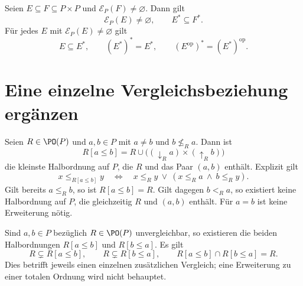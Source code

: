 \begin{theorem}
\label{b12guide:thm:generated-laws}
Seien $E\subseteq F\subseteq P\times P$ und
$\mathcal E_P(F)\ne\varnothing$. Dann gilt
\[
 \mathcal E_P(E)\ne\varnothing,\qquad E^*\subseteq F^*.
\]
Für jedes $E$ mit $\mathcal E_P(E)\ne\varnothing$ gilt
\[
 E\subseteq E^*,\qquad (E^*)^*=E^*,\qquad
 (E^{\mathrm{op}})^*=(E^*)^{\mathrm{op}}.
\]
\end{theorem}

\section{Eine einzelne Vergleichsbeziehung ergänzen}

\begin{theorem}
\label{b12guide:thm:add-comparison}
Seien $R\in\PO(P)$ und $a,b\in P$ mit $a\ne b$ und
$b\nleq_R a$. Dann ist
\[
 R[a\leq b]
   =R\cup\bigl((\downarrow_R a)\times(\uparrow_R b)\bigr)
\]
die kleinste Halbordnung auf $P$, die $R$ und das Paar $(a,b)$
enthält. Explizit gilt
\[
 x\leq_{R[a\leq b]}y
 \quad\Longleftrightarrow\quad
 x\leq_R y\ \lor\ (x\leq_R a\ \land\ b\leq_R y).
\]
Gilt bereits $a\leq_R b$, so ist $R[a\leq b]=R$.
Gilt dagegen $b<_R a$, so existiert keine Halbordnung auf $P$,
die gleichzeitig $R$ und $(a,b)$ enthält.
Für $a=b$ ist keine Erweiterung nötig.
\end{theorem}

\begin{theorem}
\label{b12guide:thm:incomparable-extension}
Sind $a,b\in P$ bezüglich $R\in\PO(P)$ unvergleichbar, so
existieren die beiden Halbordnungen
$R[a\leq b]$ und $R[b\leq a]$. Es gilt
\[
 R\subsetneq R[a\leq b],\qquad
 R\subsetneq R[b\leq a],\qquad
 R[a\leq b]\cap R[b\leq a]=R.
\]
Dies betrifft jeweils einen einzelnen zusätzlichen Vergleich;
eine Erweiterung zu einer totalen Ordnung wird nicht behauptet.
\end{theorem}

